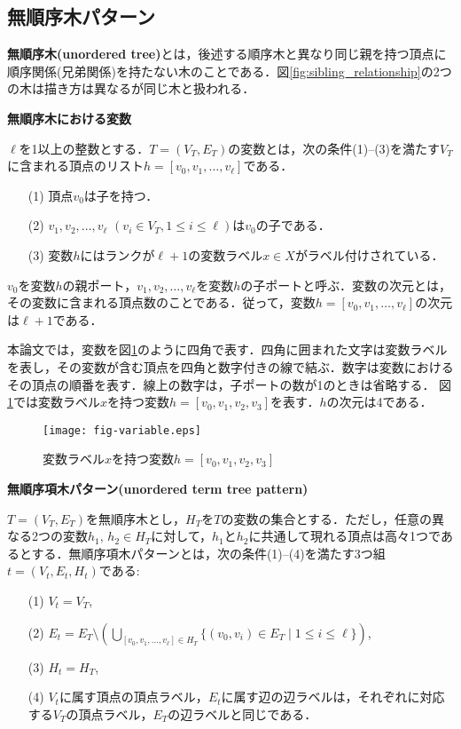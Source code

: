 \subsection{無順序木パターン}
\textbf{無順序木(unordered tree)}とは，後述する順序木と異なり同じ親を持つ頂点に順序関係(兄弟関係)を持たない木のことである．図\ref{fig:sibling_relationship}の2つの木は描き方は異なるが同じ木と扱われる．

\begin{define}{\bf 無順序木における変数}\par
  $\ell$を1以上の整数とする．$T=(V_T,E_T)$の変数とは，次の条件(1)--(3)を満たす$V_T$に含まれる頂点のリスト$h=[v_0,v_1,\ldots,v_{\ell}]$である．
  \begin{enumerate}
    \item[(1)] 頂点$v_0$は子を持つ．
    \item[(2)] $v_1,v_2,\ldots,v_{\ell}$ $(v_i \in V_T, 1\leq i\leq \ell)$は$v_0$の子である．%
    \item[(3)] 変数$h$にはランクが$\ell+1$の変数ラベル$x\in X$がラベル付けされている．
  \end{enumerate}
  $v_0$を変数$h$の親ポート，$v_1,v_2,\ldots,v_{\ell}$を変数$h$の子ポートと呼ぶ．変数の次元とは，その変数に含まれる頂点数のことである．従って，変数$h=[v_0,v_1,\ldots,v_{\ell}]$の次元は$\ell+1$である．\par
  本論文では，変数を図\ref{fig:variable}のように四角で表す．四角に囲まれた文字は変数ラベルを表し，その変数が含む頂点を四角と数字付きの線で結ぶ．数字は変数におけるその頂点の順番を表す．線上の数字は，子ポートの数が1のときは省略する．
  図\ref{fig:variable}では変数ラベル$x$を持つ変数$h=[v_0,v_1,v_2,v_3]$を表す．$h$の次元は4である．
\end{define}

\begin{figure}[tb]
  \centering
  \texttt{[image: fig-variable.eps]}
  \caption{変数ラベル$x$を持つ変数$h=[v_0,v_1,v_2,v_3]$}\label{fig:variable}
\end{figure}

\begin{define}{\bf 無順序項木パターン(unordered term tree pattern)}\par
  $T=(V_T,E_T)$を無順序木とし，$H_T$を$T$の変数の集合とする．ただし，任意の異なる2つの変数$h_1,\,h_2\in H_T$に対して，$h_1$と$h_2$に共通して現れる頂点は高々1つであるとする．無順序項木パターンとは，次の条件(1)--(4)を満たす3つ組$t=(V_t,E_t,H_t)$である:
  \begin{enumerate}
    \item[(1)] $V_t=V_T$,
    \item[(2)] $E_t=E_T\setminus \left(\bigcup_{[v_0,v_1,\ldots,v_{\ell}]\in H_T}\{(v_0,v_i)\in E_T\mid 1\leq i\leq \ell\}\right)$,
    \item[(3)] $H_t=H_T$,
    \item[(4)] $V_t$に属す頂点の頂点ラベル，$E_t$に属す辺の辺ラベルは，それぞれに対応する$V_T$の頂点ラベル，$E_T$の辺ラベルと同じである．
  \end{enumerate}
\end{define}


